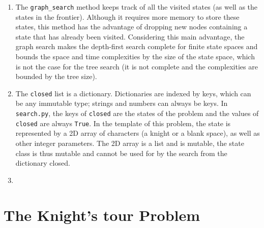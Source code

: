 \documentclass[a4paper,10pt]{article}
\newcommand{\py}[1]{\texttt{#1}}
\begin{document}
\begin{enumerate}
\begin{itemize}
 \end{itemize}
 \item The \py{graph_search} method keeps track of all the visited states (as well as the states in the frontier).
 Although it requires more memory to store these states, this method has the advantage of dropping new nodes containing a state that has already been visited.
 Considering this main advantage, the graph search makes the depth-first search complete for finite state spaces and bounds the space and time complexities by the size of the state space, which is not the case for the tree search (it is not complete and the complexities are bounded by the tree size).
 \item The \py{closed} list is a dictionary. Dictionaries are indexed by keys, which can be any immutable type; strings and numbers can always be keys. In \py{search.py}, the keys of \py{closed} are the states of the problem and the values of \py{closed} are always \py{True}. In the template of this problem, the state is represented by a 2D array of characters (a knight or a blank space), as well as other integer parameters. The 2D array is a list and is mutable, the state class is thus mutable and cannot be used for by the search from the dictionary closed. 
 \item %
\end{enumerate}


\section{The Knight’s tour Problem}
\end{document}
